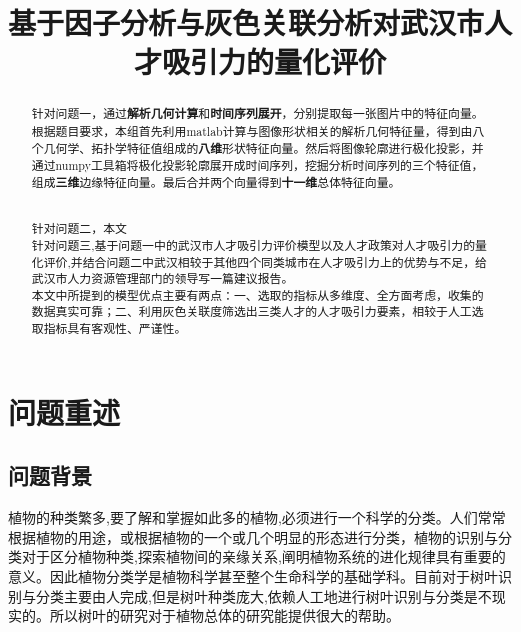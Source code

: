 \documentclass{whutmod}
\title{基于因子分析与灰色关联分析对武汉市人才吸引力的量化评价}
\begin{document}
	
	\begin{abstract}


针对问题一，通过\textbf{解析几何计算}和\textbf{时间序列展开}，分别提取每一张图片中的特征向量。根据题目要求，本组首先利用matlab计算与图像形状相关的解析几何特征量，得到由八个几何学、拓扑学特征值组成的\textbf{八维}形状特征向量。然后将图像轮廓进行极化投影，并通过numpy工具箱将极化投影轮廓展开成时间序列，挖掘分析时间序列的三个特征值，组成\textbf{三维}边缘特征向量。最后合并两个向量得到\textbf{十一维}总体特征向量。


~\\

针对问题二，本文
~\\

针对问题三,基于问题一中的武汉市人才吸引力评价模型以及人才政策对人才吸引力的量化评价,并结合问题二中武汉相较于其他四个同类城市在人才吸引力上的优势与不足，给武汉市人力资源管理部门的领导写一篇建议报告。
~\\

本文中所提到的模型优点主要有两点：一、选取的指标从多维度、全方面考虑，收集的数据真实可靠；二、利用灰色关联度筛选出三类人才的人才吸引力要素，相较于人工选取指标具有客观性、严谨性。
  
		
	\end{abstract}
	
	\tableofcontents
	\newpage	%
	
	\section{问题重述}	
	\subsection{问题背景}
    植物的种类繁多,要了解和掌握如此多的植物,必须进行一个科学的分类。人们常常根据植物的用途，或根据植物的一个或几个明显的形态进行分类，植物的识别与分类对于区分植物种类,探索植物间的亲缘关系,阐明植物系统的进化规律具有重要的意义。因此植物分类学是植物科学甚至整个生命科学的基础学科。目前对于树叶识别与分类主要由人完成,但是树叶种类庞大,依赖人工地进行树叶识别与分类是不现实的。所以树叶的研究对于植物总体的研究能提供很大的帮助。
    
\end{document}

